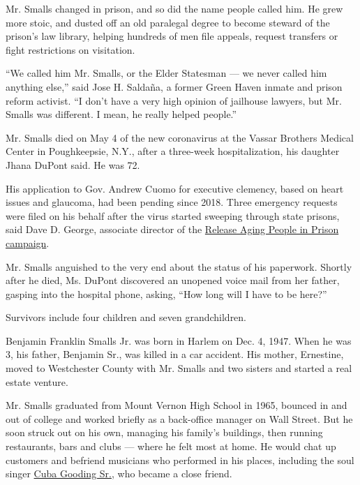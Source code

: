 Mr. Smalls changed in prison, and so did the name people called him. He
grew more stoic, and dusted off an old paralegal degree to become
steward of the prison's law library, helping hundreds of men file
appeals, request transfers or fight restrictions on visitation.

``We called him Mr. Smalls, or the Elder Statesman --- we never called
him anything else,'' said Jose H. Saldaña, a former Green Haven inmate
and prison reform activist. ``I don't have a very high opinion of
jailhouse lawyers, but Mr. Smalls was different. I mean, he really
helped people.''

Mr. Smalls died on May 4 of the new coronavirus at the Vassar Brothers
Medical Center in Poughkeepsie, N.Y., after a three-week
hospitalization, his daughter Jhana DuPont said. He was 72.

His application to Gov. Andrew Cuomo for executive clemency, based on
heart issues and glaucoma, had been pending since 2018. Three emergency
requests were filed on his behalf after the virus started sweeping
through state prisons, said Dave D. George, associate director of the
\href{https://auburnpub.com/news/local/govt-and-politics/more-covid-19-cases-in-ny-prisons-groups-urge-cuomo-to-release-high-risk-inmates/article_c616d0b8-71cd-56f3-b108-402c1abd282e.html}{Release
Aging People in Prison campaign}.

Mr. Smalls anguished to the very end about the status of his paperwork.
Shortly after he died, Ms. DuPont discovered an unopened voice mail from
her father, gasping into the hospital phone, asking, ``How long will I
have to be here?''

Survivors include four children and seven grandchildren.

Benjamin Franklin Smalls Jr. was born in Harlem on Dec. 4, 1947. When he
was 3, his father, Benjamin Sr., was killed in a car accident. His
mother, Ernestine, moved to Westchester County with Mr. Smalls and two
sisters and started a real estate venture.

Mr. Smalls graduated from Mount Vernon High School in 1965, bounced in
and out of college and worked briefly as a back-office manager on Wall
Street. But he soon struck out on his own, managing his family's
buildings, then running restaurants, bars and clubs --- where he felt
most at home. He would chat up customers and befriend musicians who
performed in his places, including the soul singer
\href{https://www.nytimes3xbfgragh.onion/2017/04/21/arts/music/cuba-gooding-sr-dead-soul-singer.html}{Cuba
Gooding Sr.}, who became a close friend.

